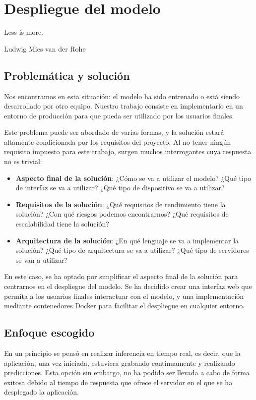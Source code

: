 \chapter{Despliegue del modelo}\label{chp-03}
\epigraph{Less is more.}{Ludwig Mies van der Rohe}

\section{Problemática y solución}

Nos encontramos en esta situación: el modelo ha sido entrenado o está siendo desarrollado por otro equipo.
Nuestro trabajo consiste en implementarlo en un entorno de producción para que pueda ser utilizado por los usuarios finales.

Este problema puede ser abordado de varias formas, y la solución estará altamente condicionada por los requisitos del proyecto.
Al no tener ningún requisito impuesto para este trabajo, surgen muchos interrogantes cuya respuesta no es trivial:

\begin{itemize}
    \item \textbf{Aspecto final de la solución}: ¿Cómo se va a utilizar el modelo? ¿Qué tipo de interfaz se va a utilizar? ¿Qué tipo de dispositivo se va a utilizar?
    \item \textbf{Requisitos de la solución}: ¿Qué requisitos de rendimiento tiene la solución? ¿Con qué riesgos podemos encontrarnos? ¿Qué requisitos de escalabilidad tiene la solución?
    \item \textbf{Arquitectura de la solución}: ¿En qué lenguaje se va a implementar la solución? ¿Qué tipo de arquitectura se va a utilizar? ¿Qué tipo de servidores se van a utilizar?
    
\end{itemize}

En este caso, se ha optado por simplificar el aspecto final de la solución para centrarnos en el despliegue del modelo.
Se ha decidido crear una interfaz web que permita a los usuarios finales interactuar con el modelo, y una implementación mediante contenedores Docker para facilitar el despliegue en cualquier entorno.

\section{Enfoque escogido}
En un principio se pensó en realizar inferencia en tiempo real, es decir, que la aplicación, una vez iniciada, estuviera grabando continuamente y realizando predicciones.
Esta opción sin embargo, no ha podido ser llevada a cabo de forma exitosa debido al tiempo de respuesta que ofrece el servidor en el que se ha desplegado la aplicación.

